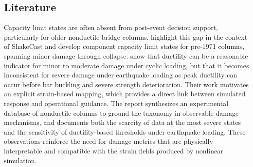 

\subsection{Literature}

Capacity limit states are often absent from post-event decision support, particularly for older nonductile bridge columns. 
\citet{zhou2022capacitya} highlight this gap in the context of ShakeCast and develop component capacity limit states for pre-1971 columns, spanning minor damage through collapse. 
\citet{zhou2022capacitya} show that ductility can be a reasonable indicator for minor to moderate damage under cyclic loading, but that it becomes inconsistent for severe damage under earthquake loading as peak ductility can occur before bar buckling and severe strength deterioration. 
Their work motivates an explicit strain-based mapping, which provides a direct link between simulated response and operational guidance.
The report synthesizes an experimental database of nonductile columns to ground the taxonomy in observable damage mechanisms, and documents both the scarcity of data at the most severe states and the sensitivity of ductility-based thresholds under earthquake loading. 
These observations reinforce the need for damage metrics that are physically interpretable and compatible with the strain fields produced by nonlinear simulation.

